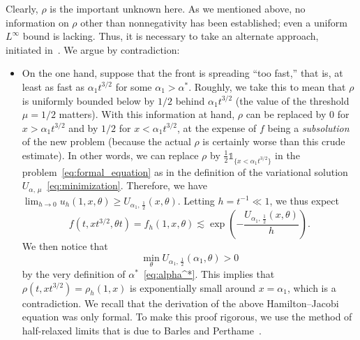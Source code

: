 \documentclass[AHL,Unicode,longabstracts]{cedram}
\newcommand{\1}{\mathds{1}}
\begin{document}
Clearly, $\rho$ is the important unknown here. As we mentioned above, no information on $\rho$ other than nonnegativity has been established; even a uniform $L^\infty$ bound is lacking. Thus, it is necessary to take an alternate approach, initiated in~\cite{BHR_acceleration}. We argue by contradiction:
\begin{itemize}
\item On the one hand, suppose that the front is spreading ``too fast,'' that is, at least as fast as $\alpha_1 t^{3/2}$ for some $\alpha_1>\alpha^*$. Roughly, we take this to mean that $\rho$ is uniformly bounded below by $1/2$ behind $\alpha_1 t^{3/2}$ (the value of the threshold $\mu = 1/2$ matters). With this information at hand, $\rho$ can be replaced by $0$ for $x > \alpha_1 t^{3/2}$ and by $1/2$ for $x < \alpha_1 t^{3/2}$, at the expense of $f$ being a \emph{subsolution} of the new problem (because the actual $\rho$ is certainly worse than this crude estimate). In other words, we can replace $\rho$ by $\frac12 \1_{\{x< \alpha_1 t^{3/2}\}}$ in the problem~\eqref{eq:formal_equation} as in the definition of the variational solution $U_{\alpha,\,\mu}$~\eqref{eq:minimization}. Therefore, we have $\lim_{h\to0} u_h(1,x,\theta) \geq U_{\alpha_1,\,\frac12}(x,\theta)$. Letting $h = t^{-1} \ll 1$, we thus expect
\begin{equation}\label{eq:parabolic_HJ_connection}
f\left(t, x t^{3/2}, \theta t\right) = f_h(1,x,\theta)
\lesssim \exp \left(- \frac{U_{\alpha_1,\,\frac12}(x,\theta)}{h} \right).
\end{equation}
We then notice that
\[
\min_\theta U_{\alpha_1,\,\frac12}\left(\alpha_1,\theta\right)>0
\]
by the very definition of $\alpha^*$~\eqref{eq:alpha^*}. This implies that $\rho(t, x t^{3/2}) = \rho_h(1,x)$ is exponentially small around $x=\alpha_1$, which is a contradiction. We recall that the derivation of the above Hamilton--Jacobi equation was only formal. To make this proof rigorous, we use the method of half-relaxed limits that is due to Barles and Perthame~\cite{barles_discontinuous_1987}.


\end{itemize}
\end{document}
